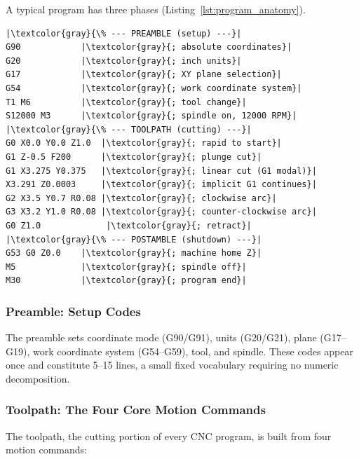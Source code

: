 \documentclass[sensors,article,submit,moreauthors,pdftex]{Definitions/mdpi}
\begin{document}
A typical program has three phases (Listing~\ref{lst:program_anatomy}).

\begin{lstlisting}[caption={Anatomy of a CNC milling program.},label=lst:program_anatomy,escapechar=|,float=htbp]
|\textcolor{gray}{\% --- PREAMBLE (setup) ---}|
G90            |\textcolor{gray}{; absolute coordinates}|
G20            |\textcolor{gray}{; inch units}|
G17            |\textcolor{gray}{; XY plane selection}|
G54            |\textcolor{gray}{; work coordinate system}|
T1 M6          |\textcolor{gray}{; tool change}|
S12000 M3      |\textcolor{gray}{; spindle on, 12000 RPM}|
|\textcolor{gray}{\% --- TOOLPATH (cutting) ---}|
G0 X0.0 Y0.0 Z1.0  |\textcolor{gray}{; rapid to start}|
G1 Z-0.5 F200      |\textcolor{gray}{; plunge cut}|
G1 X3.275 Y0.375   |\textcolor{gray}{; linear cut (G1 modal)}|
X3.291 Z0.0003     |\textcolor{gray}{; implicit G1 continues}|
G2 X3.5 Y0.7 R0.08 |\textcolor{gray}{; clockwise arc}|
G3 X3.2 Y1.0 R0.08 |\textcolor{gray}{; counter-clockwise arc}|
G0 Z1.0             |\textcolor{gray}{; retract}|
|\textcolor{gray}{\% --- POSTAMBLE (shutdown) ---}|
G53 G0 Z0.0    |\textcolor{gray}{; machine home Z}|
M5             |\textcolor{gray}{; spindle off}|
M30            |\textcolor{gray}{; program end}|
\end{lstlisting}

\subsubsection{Preamble: Setup Codes}

The preamble sets coordinate mode (G90/G91), units (G20/G21), plane (G17--G19), work coordinate system (G54--G59), tool, and spindle. These codes appear once and constitute 5--15 lines, a small fixed vocabulary requiring no numeric decomposition.

\subsubsection{Toolpath: The Four Core Motion Commands}

The toolpath, the cutting portion of every CNC program, is built from four motion commands:
\end{document}
